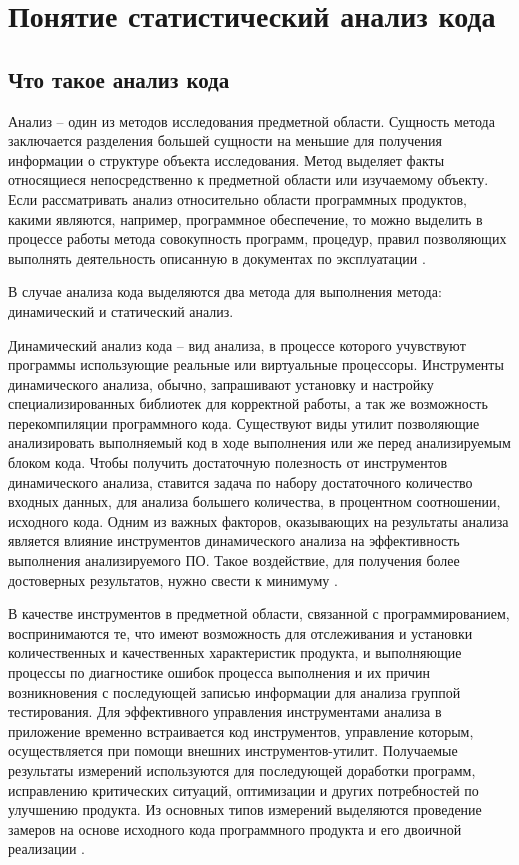 \chapter{Понятие статистический анализ кода}

 \section{Что такое анализ кода}

Анализ -- один из методов исследования предметной области. Сущность метода заключается разделения большей сущности на меньшие для получения информации о структуре объекта исследования. Метод выделяет факты относящиеся непосредственно к предметной области или изучаемому объекту. Если рассматривать анализ относительно области программных продуктов, какими являются, например, программное обеспечение, то можно выделить в процессе работы метода совокупность программ, процедур, правил позволяющих выполнять деятельность описанную в документах по эксплуатации \cite{6}.

В случае анализа кода выделяются два метода для выполнения метода: динамический и статический анализ. 
 
Динамический анализ кода -- вид анализа, в процессе которого учувствуют программы использующие реальные или виртуальные процессоры. Инструменты динамического анализа, обычно, запрашивают установку и настройку специализированных библиотек для корректной работы, а так же возможность перекомпиляции программного кода. Существуют виды утилит позволяющие анализировать выполняемый код в ходе выполнения или же перед анализируемым блоком кода. Чтобы получить достаточную полезность от инструментов динамического анализа, ставится задача по набору достаточного количество входных данных, для анализа большего количества, в процентном соотношении, исходного кода. Одним из важных факторов, оказывающих на результаты анализа является влияние инструментов динамического анализа на эффективность выполнения анализируемого ПО. Такое воздействие, для получения более достоверных результатов, нужно свести к минимуму \cite{1}. 

В качестве инструментов в предметной области, связанной с программированием, воспринимаются те, что имеют возможность для отслеживания и установки количественных и качественных характеристик продукта, и выполняющие процессы по диагностике ошибок процесса выполнения и их причин возникновения с последующей записью информации для анализа группой тестирования. Для эффективного управления инструментами анализа в приложение временно встраивается код инструментов, управление которым, осуществляется при помощи внешних инструментов-утилит. Получаемые результаты измерений используются для последующей доработки программ, исправлению критических ситуаций, оптимизации и других потребностей по улучшению продукта. Из основных типов измерений выделяются проведение замеров на основе исходного кода программного продукта и его двоичной реализации \cite{2,3}. 

